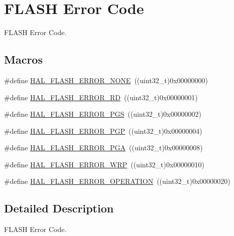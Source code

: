 \hypertarget{group___f_l_a_s_h___error___code}{}\section{F\+L\+A\+SH Error Code}
\label{group___f_l_a_s_h___error___code}


F\+L\+A\+SH Error Code.  


\subsection*{Macros}
\begin{DoxyCompactItemize}
\item 
\#define \hyperlink{group___f_l_a_s_h___error___code_gae7fb9ee7198d393aba27ade3a9f50a70}{H\+A\+L\+\_\+\+F\+L\+A\+S\+H\+\_\+\+E\+R\+R\+O\+R\+\_\+\+N\+O\+NE}~((uint32\+\_\+t)0x00000000)
\item 
\#define \hyperlink{group___f_l_a_s_h___error___code_ga33008f2ad5085cd4158dd260fb2d124d}{H\+A\+L\+\_\+\+F\+L\+A\+S\+H\+\_\+\+E\+R\+R\+O\+R\+\_\+\+RD}~((uint32\+\_\+t)0x00000001)
\item 
\#define \hyperlink{group___f_l_a_s_h___error___code_ga7132ff3b7f45c0cfe818d61bdb01dc64}{H\+A\+L\+\_\+\+F\+L\+A\+S\+H\+\_\+\+E\+R\+R\+O\+R\+\_\+\+P\+GS}~((uint32\+\_\+t)0x00000002)
\item 
\#define \hyperlink{group___f_l_a_s_h___error___code_ga4c79d30899d81069a5a7d36c9a008114}{H\+A\+L\+\_\+\+F\+L\+A\+S\+H\+\_\+\+E\+R\+R\+O\+R\+\_\+\+P\+GP}~((uint32\+\_\+t)0x00000004)
\item 
\#define \hyperlink{group___f_l_a_s_h___error___code_gad9f62b6567543610f667bce580550662}{H\+A\+L\+\_\+\+F\+L\+A\+S\+H\+\_\+\+E\+R\+R\+O\+R\+\_\+\+P\+GA}~((uint32\+\_\+t)0x00000008)
\item 
\#define \hyperlink{group___f_l_a_s_h___error___code_ga27e871d85f9311272098315bc3723075}{H\+A\+L\+\_\+\+F\+L\+A\+S\+H\+\_\+\+E\+R\+R\+O\+R\+\_\+\+W\+RP}~((uint32\+\_\+t)0x00000010)
\item 
\#define \hyperlink{group___f_l_a_s_h___error___code_gafa1433e0ca2366478928c04244310d44}{H\+A\+L\+\_\+\+F\+L\+A\+S\+H\+\_\+\+E\+R\+R\+O\+R\+\_\+\+O\+P\+E\+R\+A\+T\+I\+ON}~((uint32\+\_\+t)0x00000020)
\end{DoxyCompactItemize}


\subsection{Detailed Description}
F\+L\+A\+SH Error Code. 



